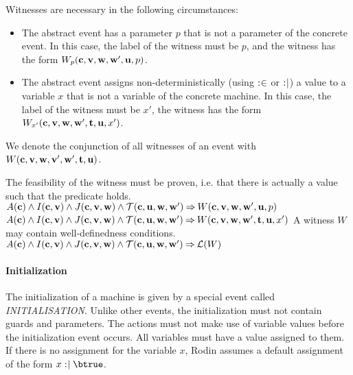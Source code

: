 Witnesses are necessary in the following circumstances:
\begin{itemize}
\item The abstract event has a parameter $p$ that is not a parameter of the concrete  event.
  In this case, the label of the witness must be $p$, and the witness has the form 
  $W_p(\mathbf{c},{\mathbf{v},\mathbf{w}},\mathbf{w}',\mathbf{u},p)$.
\item The abstract event assigns non-deterministically (using $\mathrel{:\mkern1mu\in}$ or $\mathrel{:\mkern1mu\mid}$) 
  a value to a variable $x$ that is not a variable of the concrete machine.
  In this case, the label of the witness must be $x'$, the witness has the form
  $W_{x'}(\mathbf{c},{\mathbf{v},\mathbf{w}},\mathbf{w}',{\mathbf{t},\mathbf{u}},x')$.
\end{itemize}
We denote the conjunction of all witnesses of an event with $W(\mathbf{c},{\mathbf{v},\mathbf{w}},\mathbf{v}',\mathbf{w}',{\mathbf{t},\mathbf{u}})$.

The feasibility of the witness must be proven, i.e. that there is actually a value such that the
 predicate holds.
%
  {$A(\mathbf{c}) \land I(\mathbf{c},\mathbf{v}) \land J(\mathbf{c},{\mathbf{v},\mathbf{w}}) \land
    \mathcal{T}(\mathbf{c},\mathbf{u},\mathbf{w},\mathbf{w}') \mathbin\Rightarrow
    W(\mathbf{c},{\mathbf{v},\mathbf{w}},\mathbf{w}',\mathbf{u},p)$}
%
  {$A(\mathbf{c}) \land I(\mathbf{c},\mathbf{v}) \land J(\mathbf{c},{\mathbf{v},\mathbf{w}}) \land
    \mathcal{T}(\mathbf{c},\mathbf{u},\mathbf{w},\mathbf{w}') \mathbin\Rightarrow
    W(\mathbf{c},{\mathbf{v},\mathbf{w}},\mathbf{w}',{\mathbf{t},\mathbf{u}},x')$}
A witness $W$ may contain well-definedness conditions.
%
  {$A(\mathbf{c}) \land I(\mathbf{c},\mathbf{v}) \land J(\mathbf{c},{\mathbf{v},\mathbf{w}}) \land
    \mathcal{T}(\mathbf{c},\mathbf{u},\mathbf{w},\mathbf{w}') \mathbin\Rightarrow \mathcal{L}(W)$}

\paragraph{Initialization}
The initialization of a machine is given by a special event called \textsl{INITIALISATION}.
Unlike other events, the initialization must not contain guards and parameters.
The actions must not make use of variable values before the initialization event occurs.
All variables must have a value assigned to them. If there is no assignment for the variable $x$, Rodin assumes a default assignment of the form $x\bcmsuch \btrue$.

